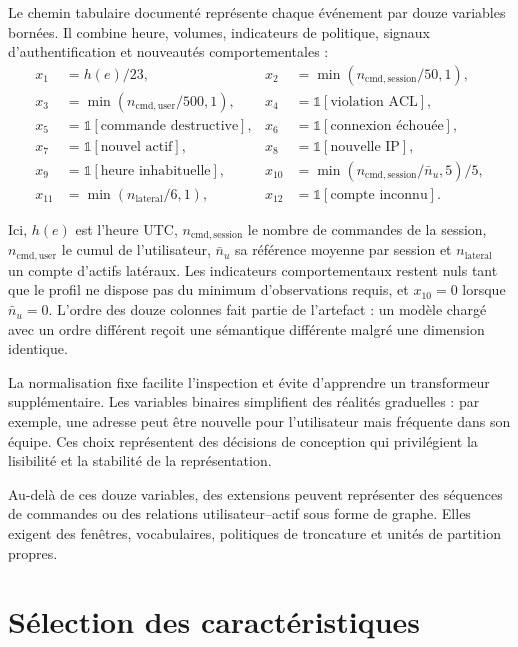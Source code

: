 \documentclass[11pt,a4paper,oneside]{report}
\theoremstyle{definition}
\theoremstyle{plain}
\begin{document}
Le chemin tabulaire documenté représente chaque événement par douze variables
bornées. Il combine heure, volumes, indicateurs de politique, signaux
d'authentification et nouveautés comportementales :
\begin{align}
x_1&=h(e)/23, &
x_2&=\min(n_{\mathrm{cmd,session}}/50,1),\nonumber\\
x_3&=\min(n_{\mathrm{cmd,user}}/500,1),&
x_4&=\mathbb{1}[\text{violation ACL}],\nonumber\\
x_5&=\mathbb{1}[\text{commande destructive}],&
x_6&=\mathbb{1}[\text{connexion échouée}],\nonumber\\
x_7&=\mathbb{1}[\text{nouvel actif}],&
x_8&=\mathbb{1}[\text{nouvelle IP}],\nonumber\\
x_9&=\mathbb{1}[\text{heure inhabituelle}],&
x_{10}&=\min(n_{\mathrm{cmd,session}}/\bar n_u,5)/5,\nonumber\\
x_{11}&=\min(n_{\mathrm{lateral}}/6,1),&
x_{12}&=\mathbb{1}[\text{compte inconnu}].
\label{eq:method-features}
\end{align}

Ici, $h(e)$ est l'heure UTC, $n_{\mathrm{cmd,session}}$ le nombre de commandes
de la session, $n_{\mathrm{cmd,user}}$ le cumul de l'utilisateur, $\bar n_u$ sa
référence moyenne par session et $n_{\mathrm{lateral}}$ un compte d'actifs
latéraux. Les indicateurs comportementaux restent nuls tant que le profil ne
dispose pas du minimum d'observations requis, et $x_{10}=0$ lorsque
$\bar n_u=0$. L'ordre des douze colonnes fait partie de l'artefact : un modèle
chargé avec un ordre différent reçoit une sémantique différente malgré une
dimension identique.

La normalisation fixe facilite l'inspection et évite d'apprendre un transformeur
supplémentaire. Les variables binaires simplifient des réalités graduelles :
par exemple, une adresse peut être nouvelle pour l'utilisateur mais fréquente
dans son équipe. Ces choix représentent des décisions de conception qui
privilégient la lisibilité et la stabilité de la représentation.

Au-delà de ces douze variables, des extensions peuvent représenter des
séquences de commandes ou des relations utilisateur--actif sous forme de
graphe. Elles exigent des fenêtres, vocabulaires, politiques de troncature et
unités de partition propres.

\section{Sélection des caractéristiques}
\label{sec:data-feature-selection}
\end{document}
